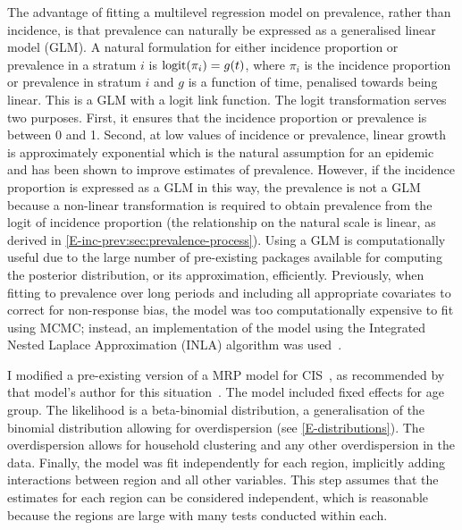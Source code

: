 \documentclass[thesis.tex]{subfiles}
\begin{document}
The advantage of fitting a multilevel regression model on prevalence, rather than incidence, is that prevalence can naturally be expressed as a generalised linear model (GLM).
A natural formulation for either incidence proportion or prevalence in a stratum $i$ is $\operatorname{logit}(\pi_i) = g(t)$, where $\pi_i$ is the incidence proportion or prevalence in stratum $i$ and $g$ is a function of time, penalised towards being linear.
This is a GLM with a logit link function.
The logit transformation serves two purposes.
First, it ensures that the incidence proportion or prevalence is between 0 and 1.
Second, at low values of incidence or prevalence, linear growth is approximately exponential which is the natural assumption for an epidemic and has been shown to improve estimates of prevalence.
However, if the incidence proportion is expressed as a GLM in this way, the prevalence is not a GLM because a non-linear transformation is required to obtain prevalence from the logit of incidence proportion (the relationship on the natural scale is linear, as derived in \cref{E-inc-prev:sec:prevalence-process}).
Using a GLM is computationally useful due to the large number of pre-existing packages available for computing the posterior distribution, or its approximation, efficiently.
Previously, when fitting to prevalence over long periods and including all appropriate covariates to correct for non-response bias, the model was too computationally expensive to fit using MCMC; instead, an implementation of the model using the Integrated Nested Laplace Approximation (INLA) algorithm was used~.

I modified a pre-existing version of a MRP model for CIS~\autocite{pouwelsMRPvaccination}, as recommended by that model's author for this situation~.
The model included fixed effects for age group.
The likelihood is a beta-binomial distribution, a generalisation of the binomial distribution allowing for overdispersion (see \cref{E-distributions}).
The overdispersion allows for household clustering and any other overdispersion in the data. 
Finally, the model was fit independently for each region, implicitly adding interactions between region and all other variables.
This step assumes that the estimates for each region can be considered independent, which is reasonable because the regions are large with many tests conducted within each.
\end{document}
